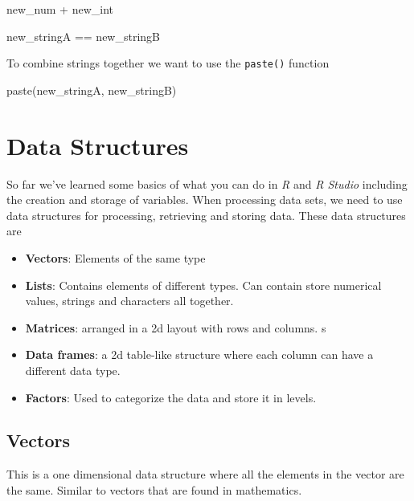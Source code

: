 \documentclass[
]{book}
\newenvironment{Shaded}{\begin{snugshade}}{\end{snugshade}}
\newcommand{\FunctionTok}[1]{\textcolor[rgb]{0.00,0.00,0.00}{#1}}
\newcommand{\NormalTok}[1]{#1}
\newcommand{\SpecialCharTok}[1]{\textcolor[rgb]{0.00,0.00,0.00}{#1}}
\begin{document}
\begin{Shaded}
\begin{Highlighting}[]
\NormalTok{new\_num }\SpecialCharTok{+}\NormalTok{ new\_int}

\NormalTok{new\_stringA }\SpecialCharTok{==}\NormalTok{ new\_stringB}
\end{Highlighting}
\end{Shaded}

To combine strings together we want to use the \texttt{paste()} function

\begin{Shaded}
\begin{Highlighting}[]
\FunctionTok{paste}\NormalTok{(new\_stringA, new\_stringB)}
\end{Highlighting}
\end{Shaded}

\hypertarget{data-structures}{%
\chapter{Data Structures}\label{data-structures}}

So far we've learned some basics of what you can do in \emph{R} and \emph{R Studio} including the creation and storage of variables. When processing data sets, we need to use data structures for processing, retrieving and storing data. These data structures are

\begin{itemize}
\item
  \textbf{Vectors}: Elements of the same type
\item
  \textbf{Lists}: Contains elements of different types. Can contain store numerical values, strings and characters all together.
\item
  \textbf{Matrices}: arranged in a 2d layout with rows and columns. s
\item
  \textbf{Data frames}: a 2d table-like structure where each column can have a different data type.
\item
  \textbf{Factors}: Used to categorize the data and store it in levels.
\end{itemize}

\hypertarget{vectors}{%
\section{Vectors}\label{vectors}}

This is a one dimensional data structure where all the elements in the vector are the same. Similar to vectors that are found in mathematics.
\end{document}
